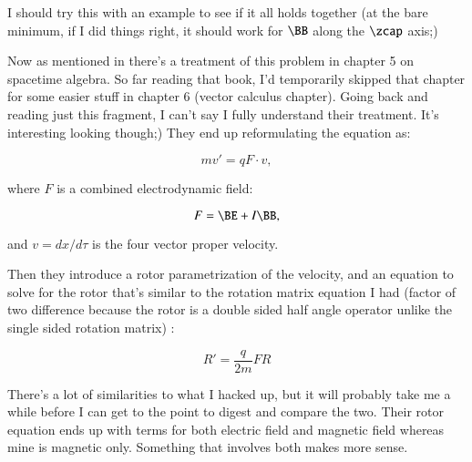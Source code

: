 I should try this with an example to see if it all holds together (at the bare minimum, if I did things right, it should work for $\BB$ along the $\zcap$ axis;)

Now as mentioned in \citep{doran2003gap} there's a treatment of this problem in chapter 5 on spacetime algebra.  So far reading that book, I'd temporarily skipped that chapter for some easier stuff in chapter 6 (vector calculus chapter).  Going back and reading just this fragment, I can't say I fully understand their treatment.  It's interesting looking though;)  They end up reformulating the equation as:

\begin{equation}\label{eqn:lorentzRotation:n}
m v' = q F \cdot v,
\end{equation}

where $F$ is a combined electrodynamic field:

\begin{equation}\label{eqn:lorentzRotation:n}
F = \BE + I \BB,
\end{equation}

and $v = dx/d\tau$ is the four vector proper velocity.

Then they introduce a rotor parametrization of the velocity, and an equation to solve for the rotor that's similar to the rotation matrix equation I had (factor of two difference because the rotor is a double sided half angle operator unlike the single sided rotation matrix) :

\begin{equation}\label{eqn:lorentzRotation:n}
R' = \frac{q}{2m} F R
\end{equation}

There's a lot of similarities to what I hacked up, but it will probably take me a while before I can get to the point to digest and compare the two.   Their rotor equation ends up with terms for both electric field and magnetic field whereas mine is magnetic only.  Something that involves both makes more sense.
